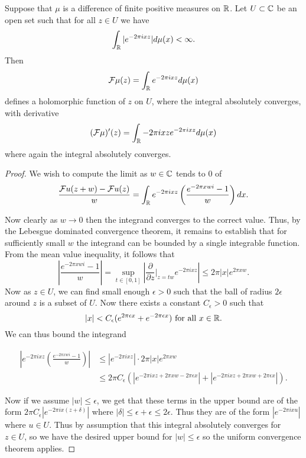 \documentclass[twoside, a4paper, 10pt]{amsart}
\begin{document}
\begin{prop} Suppose that $\mu$ is a difference of finite positive measures on $\mathbb{R}$. Let $U \subset \mathbb{C}$ be an open set such that for all $z \in U$ we have $$\int_{\mathbb{R}}| e^{-2\pi i x z} |d\mu(x) < \infty.$$ Then $$\mathcal{F}\mu(z) =  \int_{\mathbb{R}} e^{-2\pi i x z} d\mu(x)$$ defines a holomorphic function of $z$ on $U$, where the integral absolutely converges, with derivative $$(\mathcal{F}\mu)'(z) = \int_{\mathbb{R}} -2\pi i x z e^{-2\pi i x z} d\mu(x) $$ where again the integral absolutely converges.

\end{prop}

\begin{proof} We wish to compute the limit as $w \in \mathbb{C}$ tends to $0$ of $$\frac{\mathcal{F}u(z+w) - \mathcal{F}u(z)}{w} = \int_{\mathbb{R}} e^{-2\pi i xz} \left( \frac{e^{-2\pi xw i} - 1}{w} \right) dx.$$

Now clearly as $w \to 0$ then the integrand converges to the correct value. Thus, by the Lebesgue dominated convergence theorem, it remains to establish that for sufficiently small $w$ the integrand can be bounded by a single integrable function. From the mean value inequality, it follows that $$\left| \frac{e^{-2\pi xw i} - 1}{w} \right| = \sup_{t \in [0,1]} \left | \frac{\partial}{\partial z}|_{z = tw} e^{-2\pi i x z} \right | \leq 2\pi |x| e^{2\pi xw}.$$ Now as $z \in U$, we can find small enough $\epsilon>0$ such that the ball of radius $2\epsilon$ around $z$ is a subset of $U$. Now there exists a constant $C_{\epsilon}>0$ such that $$|x| < C_{\epsilon} (e^{2\pi \epsilon x} + e^{-2\pi \epsilon x}) \text{ for all } x \in \mathbb{R}.$$ We can thus bound the integrand 

\begin{align*} \left | e^{-2\pi i xz} \left( \frac{e^{-2\pi xw i} - 1}{w} \right) \right | &\leq |e^{-2\pi i x z}| \cdot  2\pi |x|e^{2\pi x w} \\ &\leq 2\pi C_{\epsilon} (|e^{-2\pi i x z + 2\pi x w - 2\pi \epsilon x }| + |e^{-2\pi i x z + 2\pi x w + 2\pi \epsilon x}| ). \end{align*}

Now if we assume $|w| \leq \epsilon$, we get that these terms in the upper bound are of the form $2\pi C_{\epsilon} |e^{-2\pi i x (z + \delta)}|$ where $|\delta| \leq \epsilon + \epsilon \leq 2\epsilon$. Thus they are of the form $|e^{-2\pi i x u}|$ where $u \in U$. Thus by assumption that this integral absolutely converges for $z \in U$, so we have the desired upper bound for $|w| \leq \epsilon$ so the uniform convergence theorem applies. \end{proof}
\end{document}
